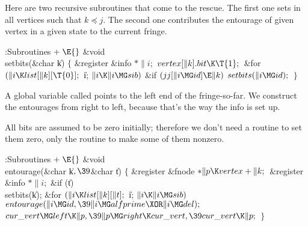 Here are two recursive subroutines that come to the rescue. The
first one sets  in all vertices 
such that $k\preceq j$.
The second one contributes the entourage of given vertex in a given state to
the current fringe.

\Y\B\4:Subroutines\X${}\mathrel+\E{}$\6
\&{void} \\{setbits}(\&{char} \|k)\1\1\2\2\6
${}\{{}$\1\6
\&{register} \&{info} ${}{*}\|i;{}$\7
${}\\{vertex}[\|k].\\{bit}\K\T{1};{}$\6
\&{for} ${}(\|i\K\\{list}[\|k][\T{0}];{}$ \|i; ${}\|i\K\|i\MG\\{sib}){}$\1\6
\&{if} ${}(\\{jj}[\|i\MG\\{id}]\E\|k){}$\1\5
${}\\{setbits}(\|i\MG\\{id});{}$\2\2\6
\4${}\}{}$\2\par
\fi

A global variable called  points to the left end of the
fringe-so-far. We construct the entourages from right to left, because
that's the way the  info is set up.

All bits are assumed to be zero initially; therefore we don't need a
routine to set them zero, only the  routine to make
some of them nonzero.

\Y\B\4:Subroutines\X${}\mathrel+\E{}$\6
\&{void} \\{entourage}(\&{char} \|k${},\39{}$\&{char} \|t)\1\1\2\2\6
${}\{{}$\1\6
\&{register} \&{fnode} ${}{*}\|p\K\\{vertex}+\|k;{}$\6
\&{register} \&{info} ${}{*}\|i;{}$\7
\&{if} (\|t)\1\5
\\{setbits}(\|k);\2\6
\&{for} ${}(\|i\K\\{list}[\|k][\|t];{}$ \|i; ${}\|i\K\|i\MG\\{sib}){}$\1\5
${}\\{entourage}(\|i\MG\\{id},\39\|i\MG\\{alfprime}\XOR\|i\MG\\{del});{}$\2\6
${}\\{cur\_vert}\MG\\{left}\K\|p,\39\|p\MG\\{right}\K\\{cur\_vert},\39\\{cur%
\_vert}\K\|p;{}$\6
\4${}\}{}$\2\par
\fi

